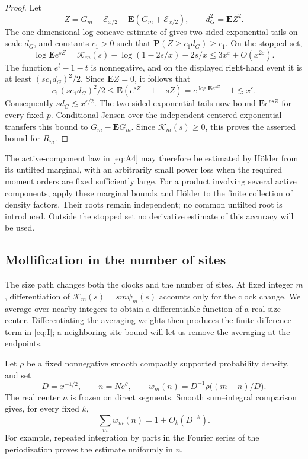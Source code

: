 \begin{proof}
Let
\[
 Z=G_m+\mathcal E_{x/2}
       -\mathbf E(G_m+\mathcal E_{x/2}),\qquad d_G^2=\mathbf E Z^2.
\]
The one-dimensional log-concave estimate of
\cite[Lemma~7.7]{PE}
gives two-sided exponential tails on scale \(d_G\), and constants
\(c_1>0\) such that \(\mathbf P(Z\ge c_1d_G)\ge c_1\).
On the stopped set,
\[
 \log\mathbf E e^{sZ}
 =\mathcal K_m(s)-\log(1-2s/x)-2s/x
 \le3x^\varepsilon+O(x^{2\varepsilon}).
\]
The function \(e^t-1-t\) is nonnegative, and on the displayed
right-hand event it is at least \((s c_1d_G)^2/2\). Since
\(\mathbf EZ=0\), it follows that
\[
 c_1(s c_1d_G)^2/2
 \le\mathbf E(e^{sZ}-1-sZ)
 =e^{\log\mathbf E e^{sZ}}-1
 \lesssim x^\varepsilon.
\]
Consequently \(s d_G\lesssim x^{\varepsilon/2}\). The two-sided
exponential tails now bound \(\mathbf E e^{p sZ}\) for every fixed
\(p\). Conditional Jensen over the independent centered exponential
transfers this bound to \(G_m-\mathbf E G_m\). Since
\(\mathcal K_m(s)\ge0\), this proves the asserted bound for \(R_m\).
\end{proof}

The active-component law in \eqref{eq:A4} may therefore be estimated by
H\"older from its untilted marginal, with an arbitrarily small power
loss when the required moment orders are fixed sufficiently large.
For a product involving several active components, apply these marginal
bounds and H\"older to the finite collection of density factors. Their
roots remain independent; no common untilted root is introduced.
Outside the stopped set no derivative estimate of this accuracy will
be used.

\subsection{Mollification in the number of sites}

The size path changes both the clocks and the number of sites.
At fixed integer \(m\), differentiation of
\(\mathcal K_m(s)=sm\psi_m(s)\) accounts only for the clock change.
We average over nearby integers to obtain a differentiable function
of a real size center. Differentiating the averaging weights then
produces the finite-difference term in \eqref{eq:I}; a neighboring-site
bound will let us remove the averaging at the endpoints.

Let \(\rho\) be a fixed nonnegative smooth compactly supported
probability density, and set
\[
 D=x^{-1/2},\qquad n=Ne^\theta,\qquad
 w_m(n)=D^{-1}\rho\bigl((m-n)/D\bigr).
\]
The real center \(n\) is frozen on direct segments. Smooth
sum--integral comparison gives, for every fixed \(k\),
\[
 \sum_m w_m(n)=1+O_k(D^{-k}).
\]
For example, repeated integration by parts in the Fourier series of
the periodization proves the estimate uniformly in \(n\).

